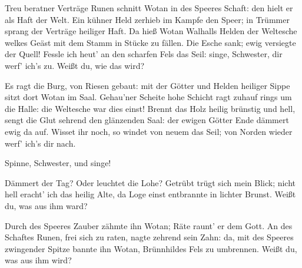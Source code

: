 \begin{drama}
\DieZweiteNornspeaks



Treu beratner Verträge Runen
schnitt Wotan in des Speeres Schaft:
den hielt er als Haft der Welt.
Ein kühner Held
zerhieb im Kampfe den Speer;
in Trümmer sprang
der Verträge heiliger Haft.
Da hieß Wotan Walhalls Helden
der Weltesche welkes Geäst
mit dem Stamm in Stücke zu fällen.
Die Esche sank;
ewig versiegte der Quell!
Fessle ich heut'
an den scharfen Fels das Seil:
singe, Schwester, dir werf' ich's zu.
Weißt du, wie das wird?
 

\DieDritteNornspeaks



Es ragt die Burg, von Riesen gebaut:
mit der Götter und Helden heiliger Sippe
sitzt dort Wotan im Saal.
Gehau'ner Scheite hohe Schicht
ragt zuhauf rings um die Halle:
die Weltesche war dies einst!
Brennt das Holz
heilig brünstig und hell,
sengt die Glut
sehrend den glänzenden Saal:
der ewigen Götter Ende
dämmert ewig da auf.
Wisset ihr noch,
so windet von neuem das Seil;
von Norden wieder werf' ich's dir nach.
 




\DieZweiteNornspeaks



Spinne, Schwester, und singe!
 

\DieErsteNornspeaks



Dämmert der Tag?
Oder leuchtet die Lohe?
Getrübt trügt sich mein Blick;
nicht hell eracht' ich das heilig Alte,
da Loge einst entbrannte in lichter Brunst.
Weißt du, was aus ihm ward?
 

\DieZweiteNornspeaks



Durch des Speeres Zauber
zähmte ihn Wotan;
Räte raunt' er dem Gott.
An des Schaftes Runen,
frei sich zu raten,
nagte zehrend sein Zahn:
da, mit des Speeres
zwingender Spitze
bannte ihn Wotan,
Brünnhildes Fels zu umbrennen.
Weißt du, was aus ihm wird?
 

\DieDritteNornspeaks



\end{drama}
